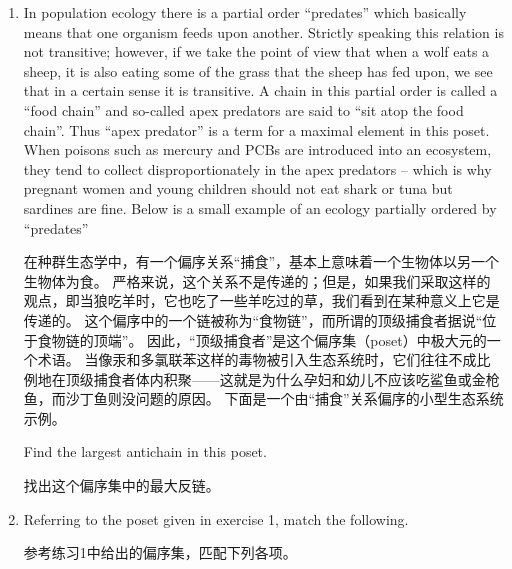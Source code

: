 \begin{enumerate}
    \item In population ecology there is a partial order ``predates''
    which basically means that one organism feeds upon another.
    Strictly
    speaking this relation is not transitive; however, if we take the point
    of view that when a wolf eats a sheep, it is also eating some of the grass
    that the sheep has fed upon, we see that in a certain sense it is transitive.
    A chain in this partial order is called a ``food chain'' and so-called 
    apex predators are said to ``sit atop the food chain''.
    Thus ``apex 
    predator'' is a term for a maximal element in this poset.
    When poisons
    such as mercury and PCBs are introduced into an ecosystem, they tend to
    collect disproportionately in the apex predators -- which is why pregnant
    women and young children should not eat shark or tuna but sardines 
    are fine.
    Below is a small example of an ecology partially ordered by ``predates''
    
    \noindent 在种群生态学中，有一个偏序关系“捕食”，基本上意味着一个生物体以另一个生物体为食。
    严格来说，这个关系不是传递的；但是，如果我们采取这样的观点，即当狼吃羊时，它也吃了一些羊吃过的草，我们看到在某种意义上它是传递的。
    这个偏序中的一个链被称为“食物链”，而所谓的顶级捕食者据说“位于食物链的顶端”。
    因此，“顶级捕食者”是这个偏序集（poset）中极大元的一个术语。
    当像汞和多氯联苯这样的毒物被引入生态系统时，它们往往不成比例地在顶级捕食者体内积聚——这就是为什么孕妇和幼儿不应该吃鲨鱼或金枪鱼，而沙丁鱼则没问题的原因。
    下面是一个由“捕食”关系偏序的小型生态系统示例。
    
    \begin{center}
    
    \end{center}
    
    Find the largest antichain in this poset.
    
    找出这个偏序集中的最大反链。
    
    \newpage
    
    \item Referring to the poset given in exercise 1, match the following.
    
    \noindent 参考练习1中给出的偏序集，匹配下列各项。
    

\end{enumerate}
